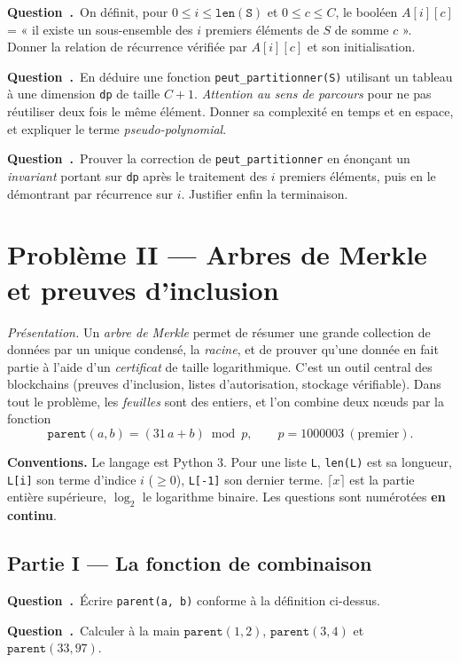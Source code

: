 \documentclass[11pt,a4paper]{article}
\newcounter{qcnt}
\newcommand{\Q}{\medskip\par\stepcounter{qcnt}\noindent\textbf{Question~\theqcnt.}~}
\newcommand{\code}[1]{\lstinline!#1!}
\begin{document}
\Q On définit, pour $0 \le i \le \mathtt{len(S)}$ et $0 \le c \le C$, le booléen $A[i][c]$ = « il
existe un sous-ensemble des $i$ premiers éléments de $S$ de somme $c$ ». Donner la relation de
récurrence vérifiée par $A[i][c]$ et son initialisation.

\Q En déduire une fonction \code{peut_partitionner(S)} utilisant un tableau à une dimension
\code{dp} de taille $C+1$. \emph{Attention au sens de parcours} pour ne pas réutiliser deux fois
le même élément. Donner sa complexité en temps et en espace, et expliquer le terme
\emph{pseudo-polynomial}.

\Q Prouver la correction de \code{peut_partitionner} en énonçant un \emph{invariant} portant sur
\code{dp} après le traitement des $i$ premiers éléments, puis en le démontrant par récurrence sur
$i$. Justifier enfin la terminaison.

\clearpage
\section*{Problème II --- Arbres de Merkle et preuves d'inclusion}
\noindent\emph{Présentation.} Un \emph{arbre de Merkle} permet de résumer une grande collection de données par un unique
condensé, la \emph{racine}, et de prouver qu'une donnée en fait partie à l'aide d'un
\emph{certificat} de taille logarithmique. C'est un outil central des blockchains (preuves
d'inclusion, listes d'autorisation, stockage vérifiable). Dans tout le problème, les
\emph{feuilles} sont des entiers, et l'on combine deux n\oe uds par la fonction
$$\mathtt{parent}(a,b) = (31\,a + b) \bmod p, \qquad p = 1000003 \ (\text{premier}).$$

\noindent\textbf{Conventions.} Le langage est Python 3. Pour une liste \code{L}, \code{len(L)}
est sa longueur, \code{L[i]} son terme d'indice $i$ ($\ge 0$), \code{L[-1]} son dernier terme.
$\lceil x \rceil$ est la partie entière supérieure, $\log_2$ le logarithme binaire. Les questions
sont numérotées \textbf{en continu}.

\medskip
\subsection*{Partie I --- La fonction de combinaison}

\Q Écrire \code{parent(a, b)} conforme à la définition ci-dessus.

\Q Calculer à la main $\mathtt{parent}(1,2)$, $\mathtt{parent}(3,4)$ et
$\mathtt{parent}(33,97)$.
\end{document}
